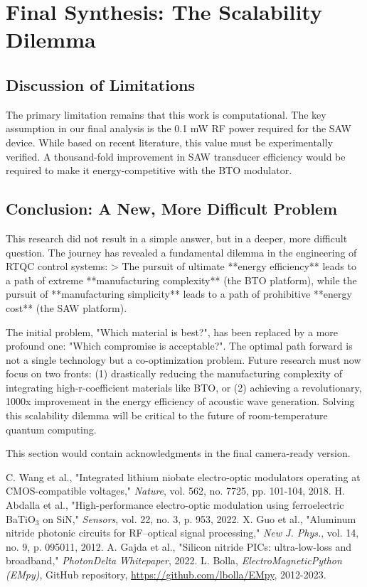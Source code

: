 \documentclass{article}
\begin{document}
\section{Final Synthesis: The Scalability Dilemma}
\subsection{Discussion of Limitations}
The primary limitation remains that this work is computational. The key assumption in our final analysis is the 0.1 mW RF power required for the SAW device. While based on recent literature, this value must be experimentally verified. A thousand-fold improvement in SAW transducer efficiency would be required to make it energy-competitive with the BTO modulator.

\subsection{Conclusion: A New, More Difficult Problem}
This research did not result in a simple answer, but in a deeper, more difficult question. The journey has revealed a fundamental dilemma in the engineering of RTQC control systems:
> The pursuit of ultimate **energy efficiency** leads to a path of extreme **manufacturing complexity** (the BTO platform), while the pursuit of **manufacturing simplicity** leads to a path of prohibitive **energy cost** (the SAW platform).

The initial problem, "Which material is best?", has been replaced by a more profound one: "Which compromise is acceptable?". The optimal path forward is not a single technology but a co-optimization problem. Future research must now focus on two fronts: (1) drastically reducing the manufacturing complexity of integrating high-r-coefficient materials like BTO, or (2) achieving a revolutionary, 1000x improvement in the energy efficiency of acoustic wave generation. Solving this scalability dilemma will be critical to the future of room-temperature quantum computing.

\begin{ack}
This section would contain acknowledgments in the final camera-ready version.
\end{ack}


\begin{thebibliography}{99}
C. Wang et al., "Integrated lithium niobate electro-optic modulators operating at CMOS-compatible voltages," \textit{Nature}, vol. 562, no. 7725, pp. 101-104, 2018.
H. Abdalla et al., "High-performance electro-optic modulation using ferroelectric BaTiO$_3$ on SiN," \textit{Sensors}, vol. 22, no. 3, p. 953, 2022.
X. Guo et al., "Aluminum nitride photonic circuits for RF–optical signal processing," \textit{New J. Phys.}, vol. 14, no. 9, p. 095011, 2012.
A. Gajda et al., "Silicon nitride PICs: ultra-low-loss and broadband," \textit{PhotonDelta Whitepaper}, 2022.
L. Bolla, \textit{ElectroMagneticPython (EMpy)}, GitHub repository, \url{https://github.com/lbolla/EMpy}, 2012-2023.
\end{thebibliography}
\end{document}
